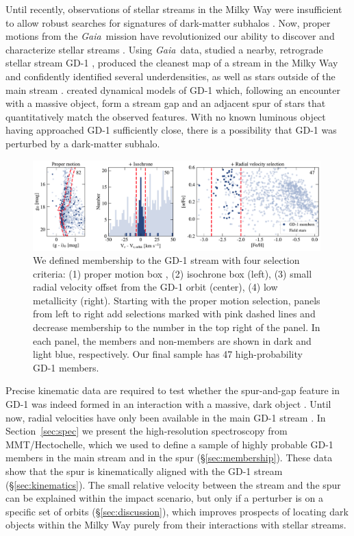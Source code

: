 \documentclass[twocolumn]{aastex63}
\newcommand{\gaia}{\textsl{Gaia}}
\begin{document}
Until recently, observations of stellar streams in the Milky Way were insufficient to allow robust searches for signatures of dark-matter subhalos \citep[cf.][]{carlberg2012, ibata2016}.
Now, proper motions from the \gaia\ mission \citep{gdr2} have revolutionized our ability to discover \citep[e.g.,][]{malhan2018,meingast2019} and characterize stellar streams \citep[e.g.,][]{bonaca2019b,shipp2019}.
Using \gaia\ data, \citet{pwb} studied a nearby, retrograde stellar stream GD-1 \citep{grillmair2006}, produced the cleanest map of a stream in the Milky Way and confidently identified several underdensities, as well as stars outside of the main stream \citep[see also][]{malhan2019b, deboer2019}.
\citet{bonaca2019a} created dynamical models of GD-1 which, following an encounter with a massive object, form a stream gap and an adjacent spur of stars that  quantitatively match the observed features.
With no known luminous object having approached GD-1 sufficiently close, there is a possibility that GD-1 was perturbed by a dark-matter subhalo.

\begin{figure}
\begin{center}
\includegraphics[width=0.99\textwidth]{members.pdf}
\end{center}
\caption{We defined membership to the GD-1 stream with four selection criteria: (1) proper motion box \citep[from][not shown]{pwb}, (2) isochrone box (left), (3) small radial velocity offset from the GD-1 orbit (center), (4) low metallicity (right).
Starting with the proper motion selection, panels from left to right add selections marked with pink dashed lines and decrease membership to the number in the top right of the panel.
In each panel, the members and non-members are shown in dark and light blue, respectively.
Our final sample has 47 high-probability GD-1 members.
}
\label{fig:members}
\end{figure}

Precise kinematic data are required to test whether the spur-and-gap feature in GD-1 was indeed formed in an interaction with a massive, dark object \citep{bonaca2019a}.
Until now, radial velocities have only been available in the main GD-1 stream \citep[][]{koposov2010,huang2019}.
In Section~\ref{sec:spec} we present the high-resolution spectroscopy from MMT/Hectochelle, which we used to define a sample of highly probable GD-1 members in the main stream and in the spur (\S\ref{sec:membership}).
These data show that the spur is kinematically aligned with the GD-1 stream (\S\ref{sec:kinematics}).
The small relative velocity between the stream and the spur can be explained within the impact scenario, but only if a perturber is on a specific set of orbits (\S\ref{sec:discussion}), which improves prospects of locating dark objects within the Milky Way purely from their interactions with stellar streams.
\end{document}
